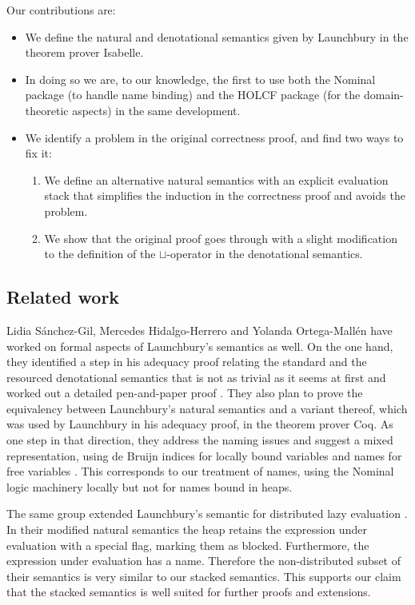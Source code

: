 \documentclass[11pt,a4paper,parskip=half]{scrartcl}
\begin{document}
Our contributions are:
\begin{itemize}
\item We define the natural and denotational semantics given by Launchbury in the theorem prover Isabelle.
\item In doing so we are, to our knowledge, the first to use both the Nominal package (to handle name binding) \cite{nominal} and the HOLCF \cite{holcf} package (for the domain-theoretic aspects) in the same development.
\item We identify a problem in the original correctness proof, and find two ways to fix it:
\begin{enumerate}
\item We define an alternative natural semantics with an explicit evaluation stack that simplifies the induction in the correctness proof and avoids the problem.
\item We show that the original proof goes through with a slight modification to the definition of the $\sqcup$-operator in the denotational semantics.
\end{enumerate}
\end{itemize}

%



\subsection{Related work}

Lidia Sánchez-Gil, Mercedes Hidalgo-Herrero and Yolanda Ortega-Mallén have worked on formal aspects of Launchbury’s semantics as well. On the one hand, they identified a step in his adequacy proof relating the standard and the resourced denotational semantics that is not as trivial as it seems at first and worked out a detailed pen-and-paper proof \cite{functionspaces}. They also plan to prove the equivalency between Launchbury’s natural semantics and a variant thereof, which was used by Launchbury in his adequacy proof, in the theorem prover Coq. As one step in that direction, they address the naming issues and suggest a mixed representation, using de Bruijn indices for locally bound variables and names for free variables \cite{nameless}. This corresponds to our treatment of names, using the Nominal logic machinery locally but not for names bound in heaps.

The same group extended Launchbury’s semantic for distributed lazy evaluation \cite{distributed}. In their modified natural semantics the heap retains the expression under evaluation with a special flag, marking them as blocked. Furthermore, the expression under evaluation has a name. Therefore the non-distributed subset of their semantics is very similar to our stacked semantics. This supports our claim that the stacked semantics is well suited for further proofs and extensions.
\end{document}
